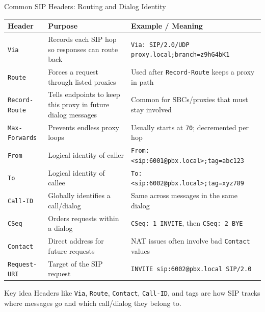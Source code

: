 \documentclass[aspectratio=169]{beamer}
\begin{document}
\begin{frame}{Common SIP Headers: Routing and Dialog Identity}
\scriptsize
\begin{tabular}{p{2.4cm} p{4.5cm} p{5.2cm}}
\toprule
\textbf{Header} & \textbf{Purpose} & \textbf{Example / Meaning} \\
\midrule
\texttt{Via} & Records each SIP hop so responses can route back & \texttt{Via: SIP/2.0/UDP proxy.local;branch=z9hG4bK1} \\
\texttt{Route} & Forces a request through listed proxies & Used after \texttt{Record-Route} keeps a proxy in path \\
\texttt{Record-Route} & Tells endpoints to keep this proxy in future dialog messages & Common for SBCs/proxies that must stay involved \\
\texttt{Max-Forwards} & Prevents endless proxy loops & Usually starts at \texttt{70}; decremented per hop \\
\texttt{From} & Logical identity of caller & \texttt{From: <sip:6001@pbx.local>;tag=abc123} \\
\texttt{To} & Logical identity of callee & \texttt{To: <sip:6002@pbx.local>;tag=xyz789} \\
\texttt{Call-ID} & Globally identifies a call/dialog & Same across messages in the same dialog \\
\texttt{CSeq} & Orders requests within a dialog & \texttt{CSeq: 1 INVITE}, then \texttt{CSeq: 2 BYE} \\
\texttt{Contact} & Direct address for future requests & NAT issues often involve bad \texttt{Contact} values \\
\texttt{Request-URI} & Target of the SIP request & \texttt{INVITE sip:6002@pbx.local SIP/2.0} \\
\bottomrule
\end{tabular}

\vspace{0.2cm}
\begin{block}{Key idea}
Headers like \texttt{Via}, \texttt{Route}, \texttt{Contact}, \texttt{Call-ID}, and tags are how SIP tracks where messages go and which call/dialog they belong to.
\end{block}
\end{frame}
\end{document}

